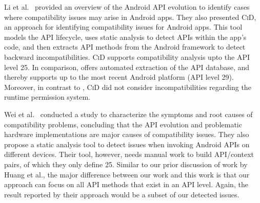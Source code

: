 Li et al.~\cite{lili2018cid} provided an overview of the
Android API evolution to identify cases where compatibility
issues may arise in Android apps. They also presented
\textsc{CiD}, an approach for identifying compatibility
issues for Android apps. This tool models the API lifecycle,
uses static analysis to detect APIs within the app's code,
and then extracts API methods from the Android framework to
detect backward incompatibilities.  \textsc{CiD} supports
compatibility analysis upto the API level 25.  In
comparison, \@approach offers automated extraction of the
API database, and thereby supports up to the most recent
Android platform (API level 29).  Moreover, in contrast to
\@approach, \textsc{CiD} did not consider incompatibilities
regarding the runtime permission system.

Wei et al.~\cite{wei2016taming} conducted a study to
characterize the symptoms and root causes of compatibility
problems, concluding that the API evolution and problematic
hardware implementations are major causes of compatibility
issues. They also propose a static analysis tool to detect
issues when invoking Android APIs on different devices.
Their tool, however, needs manual work to build API/context
pairs, of which they only define 25. Similar to our prior
discussion of work by Huang et al., the major difference
between our work and this work is that our approach can
focus on all API methods that exist in an API level. Again,
the result reported by their approach would be a subset of
our detected issues.
